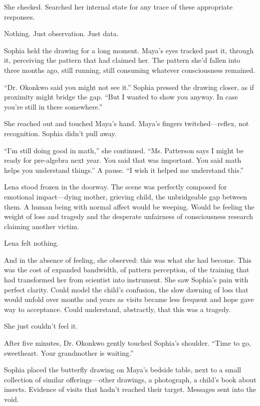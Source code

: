 She checked. Searched her internal state for any trace of these appropriate responses.

Nothing. Just observation. Just data.

Sophia held the drawing for a long moment. Maya's eyes tracked past it, through it, perceiving the pattern that had claimed her. The pattern she'd fallen into three months ago, still running, still consuming whatever consciousness remained.

``Dr. Okonkwo said you might not see it.'' Sophia pressed the drawing closer, as if proximity might bridge the gap. ``But I wanted to show you anyway. In case you're still in there somewhere.''

She reached out and touched Maya's hand. Maya's fingers twitched—reflex, not recognition. Sophia didn't pull away.

``I'm still doing good in math,'' she continued. ``Ms. Patterson says I might be ready for pre-algebra next year. You said that was important. You said math helps you understand things.'' A pause. ``I wish it helped me understand this.''

Lena stood frozen in the doorway. The scene was perfectly composed for emotional impact—dying mother, grieving child, the unbridgeable gap between them. A human being with normal affect would be weeping. Would be feeling the weight of loss and tragedy and the desperate unfairness of consciousness research claiming another victim.

Lena felt nothing.

And in the absence of feeling, she observed: this was what she had become. This was the cost of expanded bandwidth, of pattern perception, of the training that had transformed her from scientist into instrument. She saw Sophia's pain with perfect clarity. Could model the child's confusion, the slow dawning of loss that would unfold over months and years as visits became less frequent and hope gave way to acceptance. Could understand, abstractly, that this was a tragedy.

She just couldn't feel it.

After five minutes, Dr. Okonkwo gently touched Sophia's shoulder. ``Time to go, sweetheart. Your grandmother is waiting.''

Sophia placed the butterfly drawing on Maya's bedside table, next to a small collection of similar offerings—other drawings, a photograph, a child's book about insects. Evidence of visits that hadn't reached their target. Messages sent into the void.

